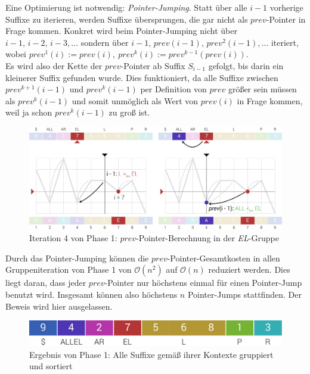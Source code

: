 \documentclass[twoside,a4paper,11pt]{article}
\theoremstyle{break}
\begin{document}
Eine Optimierung ist notwendig: \textit{Pointer-Jumping}. Statt über alle $i - 1$ vorherige Suffixe zu iterieren, werden Suffixe übersprungen, die gar nicht als $prev$-Pointer in Frage kommen. Konkret wird beim Pointer-Jumping nicht über $i - 1,\, i - 2,\, i - 3, \dots$ sondern über $i - 1,\, prev(i - 1),\, prev^2(i - 1), \dots$ iteriert, wobei $prev^1(i) := prev(i),\ prev^k(i) := prev^{k - 1}(prev(i))$.\\

Es wird also der Kette der $prev$-Pointer ab Suffix $S_{i - 1}$ gefolgt, bis darin ein kleinerer Suffix gefunden wurde. Dies funktioniert, da alle Suffixe zwischen $prev^{k + 1}(i - 1)$ und $prev^k(i - 1)$ per Definition von $prev$ größer sein müssen als $prev^k(i - 1)$ und somit unmöglich als Wert von $prev(i)$ in Frage kommen, weil ja schon $prev^k(i - 1)$ zu groß ist.

\begin{figure}[h]
	\centering
	\includegraphics[width=\linewidth,bb=0 0 1310 534]{./assets/phase1-EL.pdf}
	\caption{Iteration 4 von Phase 1: $prev$-Pointer-Berechnung in der \textit{EL}-Gruppe}
\label{fig:phase1-EL}
\end{figure}

Durch das Pointer-Jumping können die $prev$-Pointer-Gesamtkosten in allen Gruppeniteration von Phase 1 von $\mathcal{O}(n^2)$ auf $\mathcal{O}(n)$ reduziert werden. Dies liegt daran, dass jeder $prev$-Pointer nur höchstens einmal für einen Pointer-Jump benutzt wird. Insgesamt können also höchstens $n$ Pointer-Jumps stattfinden. Der Beweis wird hier ausgelassen.
\begin{figure}[h]
	\centering
	\includegraphics[width=0.5\linewidth,bb=0 0 640 67]{./assets/phase1Result.pdf}
	\caption{Ergebnis von Phase 1: Alle Suffixe gemäß ihrer Kontexte gruppiert und sortiert}
\label{fig:phase1Result}
\end{figure}
\end{document}

